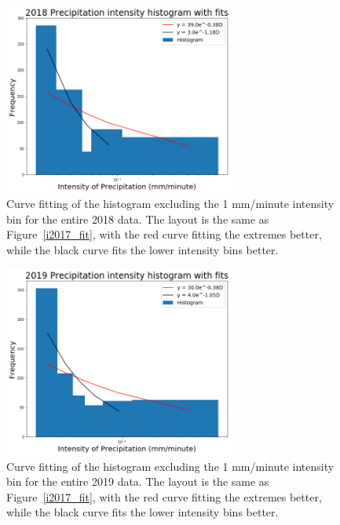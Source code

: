\documentclass[11pt]{report}
\begin{document}
\begin{figure}[b]
	\centering
	\includegraphics[width=0.675\textwidth]{Figures/inten2018_fit.png}
	\caption[Fitting Intensity histogram for 2018 with different bins]
	{\label{i2018_fit} Curve fitting of the histogram excluding the 1 mm/minute intensity bin for the entire 2018 data. The layout is the same as Figure~\ref{i2017_fit}, with the red curve fitting the extremes better, while the black curve fits the lower intensity bins better. }
\end{figure}

\clearpage
\begin{figure}[t]
	\centering
	\includegraphics[width=0.675\textwidth]{Figures/inten2019_fit.png}
	\caption[Fitting Intensity histogram for 2019 with different bins]
	{\label{i2019_fit}  Curve fitting of the histogram excluding the 1 mm/minute intensity bin for the entire 2019 data. The layout is the same as Figure~\ref{i2017_fit}, with the red curve fitting the extremes better, while the black curve fits the lower intensity bins better. 
	}
\end{figure}
\end{document}
